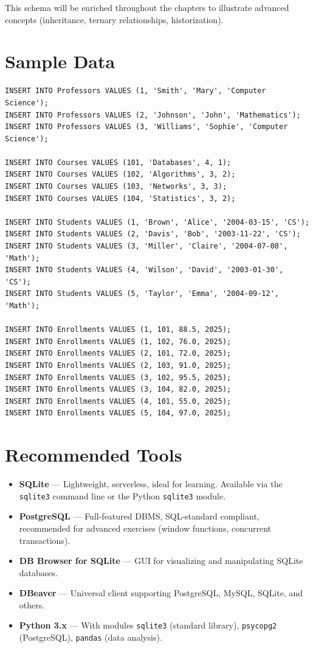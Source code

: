 This schema will be enriched throughout the chapters to illustrate advanced
concepts (inheritance, ternary relationships, historization).

\section*{Sample Data}

\begin{codeblock}[title=\textbf{Inserting Sample Data}]
\begin{verbatim}
INSERT INTO Professors VALUES (1, 'Smith', 'Mary', 'Computer Science');
INSERT INTO Professors VALUES (2, 'Johnson', 'John', 'Mathematics');
INSERT INTO Professors VALUES (3, 'Williams', 'Sophie', 'Computer Science');

INSERT INTO Courses VALUES (101, 'Databases', 4, 1);
INSERT INTO Courses VALUES (102, 'Algorithms', 3, 2);
INSERT INTO Courses VALUES (103, 'Networks', 3, 3);
INSERT INTO Courses VALUES (104, 'Statistics', 3, 2);

INSERT INTO Students VALUES (1, 'Brown', 'Alice', '2004-03-15', 'CS');
INSERT INTO Students VALUES (2, 'Davis', 'Bob', '2003-11-22', 'CS');
INSERT INTO Students VALUES (3, 'Miller', 'Claire', '2004-07-08', 'Math');
INSERT INTO Students VALUES (4, 'Wilson', 'David', '2003-01-30', 'CS');
INSERT INTO Students VALUES (5, 'Taylor', 'Emma', '2004-09-12', 'Math');

INSERT INTO Enrollments VALUES (1, 101, 88.5, 2025);
INSERT INTO Enrollments VALUES (1, 102, 76.0, 2025);
INSERT INTO Enrollments VALUES (2, 101, 72.0, 2025);
INSERT INTO Enrollments VALUES (2, 103, 91.0, 2025);
INSERT INTO Enrollments VALUES (3, 102, 95.5, 2025);
INSERT INTO Enrollments VALUES (3, 104, 82.0, 2025);
INSERT INTO Enrollments VALUES (4, 101, 55.0, 2025);
INSERT INTO Enrollments VALUES (5, 104, 97.0, 2025);
\end{verbatim}
\end{codeblock}

\section*{Recommended Tools}

\begin{itemize}
    \item \textbf{SQLite} --- Lightweight, serverless, ideal for learning.
          Available via the \texttt{sqlite3} command line or the Python
          \texttt{sqlite3} module.
    \item \textbf{PostgreSQL} --- Full-featured DBMS, SQL-standard compliant,
          recommended for advanced exercises (window functions, concurrent
          transactions).
    \item \textbf{DB Browser for SQLite} --- GUI for visualizing and
          manipulating SQLite databases.
    \item \textbf{DBeaver} --- Universal client supporting PostgreSQL,
          MySQL, SQLite, and others.
    \item \textbf{Python 3.x} --- With modules \texttt{sqlite3} (standard library),
          \texttt{psycopg2} (PostgreSQL), \texttt{pandas} (data analysis).
\end{itemize}

